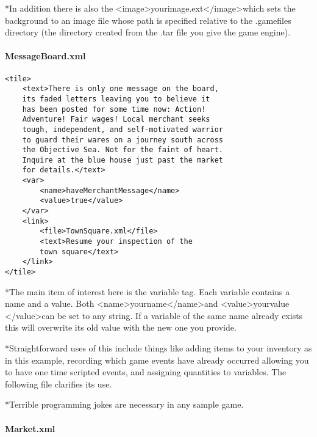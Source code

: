 \documentclass[11pt]{article}
\begin{document}
*In addition there is also the \textless image\textgreater yourimage.ext\textless /image\textgreater which sets the background to an image file whose path is specified relative to the .gamefiles directory (the directory created from the .tar file you give the game engine).

\paragraph{MessageBoard.xml}

\begin{lstlisting}[frame=single]
<tile>
	<text>There is only one message on the board, 
	its faded letters leaving you to believe it 
	has been posted for some time now: Action! 
	Adventure! Fair wages! Local merchant seeks 
	tough, independent, and self-motivated warrior 
	to guard their wares on a journey south across 
	the Objective Sea. Not for the faint of heart. 
	Inquire at the blue house just past the market 
	for details.</text>
	<var>
		<name>haveMerchantMessage</name>
		<value>true</value>
	</var> 
	<link>
		<file>TownSquare.xml</file>
		<text>Resume your inspection of the 
		town square</text>
	</link>
</tile>
\end{lstlisting}
*The main item of interest here is the variable tag. Each variable contains a name and a value. Both \textless name\textgreater yourname\textless /name\textgreater  and \textless value\textgreater yourvalue \textless /value\textgreater  can be set to any string. If a variable of the same name already exists this will overwrite its old value with the new one you provide.

*Straightforward uses of this include things like adding items to your inventory as in this example, recording which game events have already occurred allowing you to have one time scripted events, and assigning quantities to variables. The following file clarifies its use.

*Terrible programming jokes are necessary in any sample game.


\paragraph{Market.xml}
\end{document}
